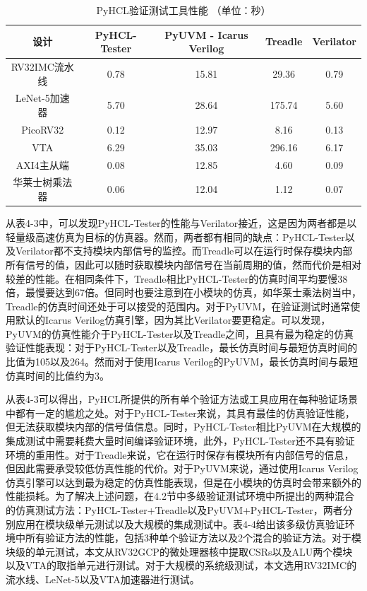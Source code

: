 \begin{table}
	\caption{PyHCL验证测试工具性能 （单位：秒）}
	\centering
	\begin{tabular}{ccccc}
		\toprule
		\multicolumn{1}{c}{设计} & PyHCL-Tester& PyUVM - Icarus Verilog & Treadle & Verilator \\
		\midrule
		RV32IMC流水线 & 0.78  & 15.81  & 29.36  & 0.79  \\
		LeNet-5加速器 & 5.70  & 28.64  & 175.74  & 5.60  \\
		PicoRV32 & 0.12  & 12.97  & 8.16  & 0.13  \\
		VTA   & 6.29  & 35.03  & 296.16  & 6.17  \\
		AXI4主从端 & 0.08  & 12.85  & 4.60  & 0.09  \\
		华莱士树乘法器 & 0.06  & 12.04  & 1.12  & 0.07  \\
		\bottomrule
	\end{tabular}%
\end{table}%

从表4-3中，可以发现PyHCL-Tester的性能与Verilator接近，这是因为两者都是以轻量级高速仿真为目标的仿真器。然而，两者都有相同的缺点：PyHCL-Tester以及Verilator都不支持模块内部信号的监控。而Treadle可以在运行时保存模块内部所有信号的值，因此可以随时获取模块内部信号在当前周期的值，然而代价是相对较差的性能。在相同条件下，Treadle相比PyHCL-Tester的仿真时间平均要慢38倍，最慢要达到67倍。但同时也要注意到在小模块的仿真，如华莱士乘法树当中，Treadle的仿真时间还处于可以接受的范围内。对于PyUVM，在验证测试时通常使用默认的Icarus Verilog仿真引擎，因为其比Verilator要更稳定。可以发现，PyUVM的仿真性能介于PyHCL-Tester以及Treadle之间，且具有最为稳定的仿真验证性能表现：对于PyHCL-Tester以及Treadle，最长仿真时间与最短仿真时间的比值为105以及264。然而对于使用Icarus Verilog的PyUVM，最长仿真时间与最短仿真时间的比值约为3。

从表4-3可以得出，PyHCL所提供的所有单个验证方法或工具应用在每种验证场景中都有一定的尴尬之处。对于PyHCL-Tester来说，其具有最佳的仿真验证性能，但无法获取模块内部的信号值信息。同时，PyHCL-Tester相比PyUVM在大规模的集成测试中需要耗费大量时间编译验证环境，此外，PyHCL-Tester还不具有验证环境的重用性。对于Treadle来说，它在运行时保存有模块所有内部信号的信息，但因此需要承受较低仿真性能的代价。对于PyUVM来说，通过使用Icarus Verilog仿真引擎可以达到最为稳定的仿真性能表现，但是在小模块的仿真时会带来额外的性能损耗。为了解决上述问题，在4.2节中多级验证测试环境中所提出的两种混合的仿真测试方法：PyHCL-Tester+Treadle以及PyUVM+PyHCL-Tester，两者分别应用在模块级单元测试以及大规模的集成测试中。表4-4给出该多级仿真验证环境中所有验证方法的性能，包括3种单个验证方法以及2个混合的验证方法。对于模块级的单元测试，本文从RV32GCP的微处理器核中提取CSRs以及ALU两个模块以及VTA的取指单元进行测试。对于大规模的系统级测试，本文选用RV32IMC的流水线、LeNet-5以及VTA加速器进行测试。

